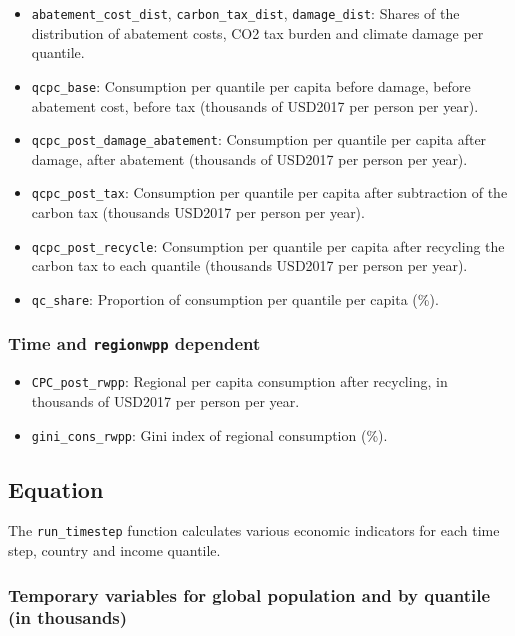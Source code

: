 \documentclass[
]{article}
\providecommand{\tightlist}{%
  \setlength{\itemsep}{0pt}\setlength{\parskip}{0pt}}
\begin{document}
\begin{itemize}
\tightlist
\item
  \texttt{abatement\_cost\_dist}, \texttt{carbon\_tax\_dist},
  \texttt{damage\_dist}: Shares of the distribution of abatement costs,
  CO2 tax burden and climate damage per quantile.
\item
  \texttt{qcpc\_base}: Consumption per quantile per capita before damage, before
  abatement cost, before tax (thousands of USD2017 per person per year).
\item
  \texttt{qcpc\_post\_damage\_abatement}: Consumption per quantile per capita after damage, after
  abatement (thousands of
  USD2017 per person per year).
\item
  \texttt{qcpc\_post\_tax}: Consumption per quantile per capita after
  subtraction of the carbon tax (thousands USD2017 per person per year).
\item
  \texttt{qcpc\_post\_recycle}: Consumption per quantile per capita after
  recycling the carbon tax to each quantile (thousands USD2017 per
  person per year).
\item
  \texttt{qc\_share}: Proportion of consumption per quantile per capita
  (\%).
\end{itemize}

\subsubsection{\texorpdfstring{Time and \texttt{regionwpp}
dependent}{Time and regionwpp dependent}}\label{time-and-regionwpp-dependent}

\begin{itemize}
\tightlist
\item
  \texttt{CPC\_post\_rwpp}: Regional per capita consumption after
  recycling, in thousands of USD2017 per person per year.
\item
  \texttt{gini\_cons\_rwpp}: Gini index of regional consumption (\%).
\end{itemize}

\subsection{Equation}\label{equation-1}

The \texttt{run\_timestep} function calculates various economic
indicators for each time step, country and income quantile.


\subsubsection{Temporary variables for global population and by quantile (in
thousands)}\label{population-by-quantile-in-thousands}
\end{document}
